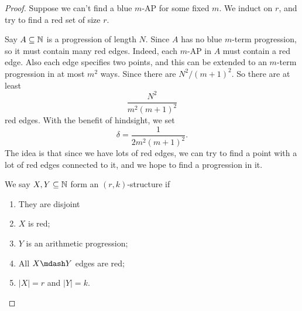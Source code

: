 \documentclass[a4paper]{article}
\begin{document}
  \begin{proof}
    Suppose we can't find a blue $m$-AP for some fixed $m$. We induct on $r$, and try to find a red set of size $r$.

    Say $A \subseteq \mathbb{N}$ is a progression of length $N$. Since $A$ has no blue $m$-term progression, so it must contain many red edges. Indeed, each $m$-AP in $A$ must contain a red edge. Also each edge specifies two points, and this can be extended to an $m$-term progression in at most $m^2$ ways. Since there are $N^2/(m + 1)^2$. So there are at least
    \[
      \frac{N^2}{m^2(m + 1)^2}
    \]
    red edges. With the benefit of hindsight, we set
    \[
      \delta = \frac{1}{2m^2(m + 1)^2}.
    \]
    The idea is that since we have lots of red edges, we can try to find a point with a lot of red edges connected to it, and we hope to find a progression in it.

    We say $X, Y \subseteq \mathbb{N}$ form an $(r, k)$-structure if
    \begin{enumerate}
    \item They are disjoint
    \item $X$ is red;
    \item $Y$ is an arithmetic progression;
    \item All $X\mdash Y$ edges are red;
    \item $|X| = r$ and $|Y| = k$.
    \end{enumerate} %
    \begin{center}
\end{center}
\end{proof}
\end{document}
